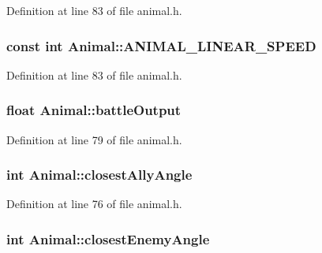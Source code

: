 Definition at line 83 of file animal.\-h.

\hypertarget{class_animal_a4468a9e53e199e90deccd07d2315f13a}{
\subsubsection[{A\-N\-I\-M\-A\-L\-\_\-\-L\-I\-N\-E\-A\-R\-\_\-\-S\-P\-E\-E\-D}]{\setlength{\rightskip}{0pt plus 5cm}const int Animal\-::\-A\-N\-I\-M\-A\-L\-\_\-\-L\-I\-N\-E\-A\-R\-\_\-\-S\-P\-E\-E\-D\hspace{0.3cm}{\ttfamily [protected]}}}\label{class_animal_a4468a9e53e199e90deccd07d2315f13a}


Definition at line 83 of file animal.\-h.

\hypertarget{class_animal_a3db09e6629852d9a54dc5b6648d3fb28}{
\subsubsection[{battle\-Output}]{\setlength{\rightskip}{0pt plus 5cm}float Animal\-::battle\-Output\hspace{0.3cm}{\ttfamily [protected]}}}\label{class_animal_a3db09e6629852d9a54dc5b6648d3fb28}


Definition at line 79 of file animal.\-h.

\hypertarget{class_animal_a53819180fe828fe2b68c7bbd7932ec9d}{
\subsubsection[{closest\-Ally\-Angle}]{\setlength{\rightskip}{0pt plus 5cm}int Animal\-::closest\-Ally\-Angle\hspace{0.3cm}{\ttfamily [protected]}}}\label{class_animal_a53819180fe828fe2b68c7bbd7932ec9d}


Definition at line 76 of file animal.\-h.

\hypertarget{class_animal_a38e826603b1d70a75c89c59964d7e34e}{
\subsubsection[{closest\-Enemy\-Angle}]{\setlength{\rightskip}{0pt plus 5cm}int Animal\-::closest\-Enemy\-Angle\hspace{0.3cm}{\ttfamily [protected]}}}\label{class_animal_a38e826603b1d70a75c89c59964d7e34e}



